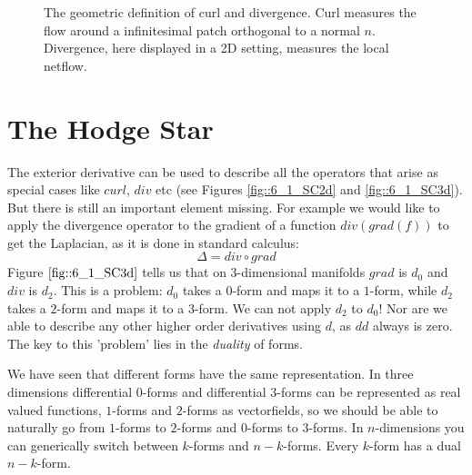 \begin{figure}%
\begin{center}
\def\svgwidth{8cm}
%	
\end{center}
\caption{The geometric definition of curl and divergence. Curl measures the flow around a infinitesimal patch orthogonal to a normal $n$. Divergence, here displayed in a 2D setting, measures the local netflow. }%
\label{fig:6_curlDiv}%
\end{figure}


\section{The Hodge Star}

\label{sec:hodgeStar}
The exterior derivative can be used to describe all the operators that arise as special cases like $curl$, $div$ etc (see Figures \ref{fig::6_1_SC2d} and \ref{fig::6_1_SC3d}). But there is still an important element missing. For example we would like to apply the divergence operator to the gradient of a function $div(grad(f))$ to get the Laplacian, as it is done in standard calculus:
\[\Delta = div\circ grad\]
Figure $\ref{fig::6_1_SC3d}$ tells us that on 3-dimensional manifolds $grad$ is $d_0$ and $div$ is $d_2$.   This is a problem: $d_0$ takes a $0$-form and maps it to a $1$-form, while $d_2$ takes a $2$-form and maps it to a $3$-form. We can not apply $d_2$ to $d_0$! Nor are we able to describe any other higher order derivatives using $d$, as $dd$ always is zero.
The key to this 'problem' lies in the \emph{duality} of forms. 

We have seen that different forms have the same representation. In three dimensions differential $0$-forms and differential $3$-forms can be represented as real valued functions, $1$-forms and $2$-forms as vectorfields, so we should be able to naturally go from $1$-forms to $2$-forms and $0$-forms to $3$-forms. In $n$-dimensions you can generically switch between $k$-forms and $n-k$-forms. Every $k$-form has a dual $n-k$-form.

